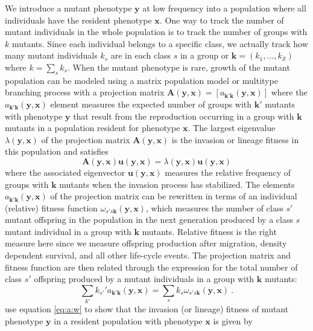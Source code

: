 \documentclass[11pt]{article}
\renewcommand{\vec}[1]{\symbf{#1}}
\newcommand{\eig}{\lambda}
\newcommand{\numc}{\mathcal{S}}
\begin{document}
We introduce a mutant phenotype $\vec{y}$ at low frequency into a population where all individuals have the resident phenotype $\vec{x}$. One way to track the number of mutant individuals in the whole population is to track the number of groups with $k$ mutants. Since each individual belongs to a specific class, we actually track how many mutant individuals $k_{s}$ are in each class $s$ in a group or $\vec{k} = (k_{1},\ldots,k_{\numc})$ where $k = \sum_{s} k_{s}$. When the mutant phenotype is rare, growth of the mutant population can be modeled using a matrix population model \cite{Caswell:2006} or multitype branching process \cite{Kimmel:Axelrod:2015} with a projection matrix $\vec{A}(\vec{y}, \vec{x}) = [a_{\vec{k}'\vec{k}}(\vec{y}, \vec{x})]$ where the $a_{\vec{k}'\vec{k}}(\vec{y}, \vec{x})$ element measures the expected number of groups with $\vec{k}'$ mutants with phenotype $\vec{y}$ that result from the reproduction occurring in a group with $\vec{k}$ mutants in a population resident for phenotype $\vec{x}$. The largest eigenvalue $\eig(\vec{y}, \vec{x})$ of the projection matrix $\vec{A}(\vec{y}, \vec{x})$ is the invasion or lineage fitness in this population and satisfies
\begin{equation}
  \label{eq:Au:eigu}
  \vec{A}(\vec{y}, \vec{x}) \vec{u}(\vec{y}, \vec{x}) = \eig(\vec{y}, \vec{x}) \vec{u}(\vec{y}, \vec{x})
\end{equation}
where the associated eigenvector $\vec{u}(\vec{y}, \vec{x})$ measures the relative frequency of groups with $\vec{k}$ mutants when the invasion process has stabilized. The elements $a_{\vec{k}'\vec{k}}(\vec{y}, \vec{x})$ of the projection matrix can be rewritten in terms of an individual (relative) fitness function $\omega_{s'\!s\vec{k}}(\vec{y}, \vec{x})$, which measures the number of class $s'$ mutant offspring in the population in the next generation produced by a class $s$ mutant individual in a group with $\vec{k}$ mutants. Relative fitness is the right measure here since we measure offspring production after migration, density dependent survival, and all other life-cycle events. The projection matrix and fitness function are then related through the expression for the total number of class $s'$ offspring produced by a mutant individuals in a group with $\vec{k}$ mutants:
\begin{equation}
  \label{eq:a:w}
  \sum_{k'} k_{s'}' a_{\vec{k}'\vec{k}}(\vec{y}, \vec{x}) = \sum_{s} k_{s} \omega_{s'\!s\vec{k}}(\vec{y}, \vec{x}) \: .
\end{equation}
\citeauthor{Lehmann:Mullon:2016} \cite{Lehmann:Mullon:2016,Lehmann:Rousset:2020} use equation \eqref{eq:a:w} to show that the invasion (or lineage) fitness of mutant phenotype $\vec{y}$ in a resident population with phenotype $\vec{x}$ is given by
\end{document}
